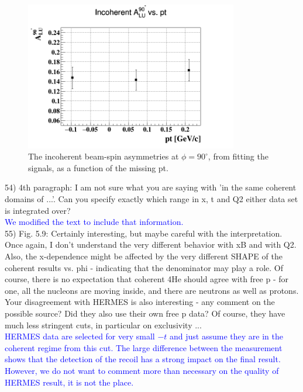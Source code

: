  \begin{figure}[h!]
  \centering
  \includegraphics[height=6.5cm]{fig/incoh_PT_alpha.png}
  \caption{The incoherent beam-spin asymmetries at $\phi = 90 ^{\circ}$, from 
  fitting the signals, as a function of the missing pt.}
  \label{fig:alu_alpha_bins_pt}
 \end{figure}




54) 4th paragraph: I am not sure what you are saying with 'in the same coherent 
domains of ...'. Can you specify exactly which range in x, t and Q2 either data 
set is integrated over?\\
\textcolor{blue}{We modified the text to include that information. }\\

55) Fig. 5.9: Certainly interesting, but maybe careful with the interpretation.  
Once again, I don't understand the very different behavior with xB and with Q2.  
Also, the x-dependence might be affected by the very different SHAPE of the 
coherent results vs. phi - indicating that the denominator may play a role. Of 
course, there is no expectation that coherent 4He should agree with free p - 
for one, all the nucleons are moving inside, and there are neutrons as well as 
protons.  Your disagreement with HERMES is also interesting - any comment on 
the possible source? Did they also use their own free p data? Of course, they 
have much less stringent cuts, in particular on exclusivity ... \\
\textcolor{blue}{HERMES data are selected for very small $-t$ and just assume 
they are in the coherent regime from this cut. The large difference between the 
measurement shows that the detection of the recoil has a strong impact on the 
final result. However, we do not want to comment more than necessary on the 
quality of HERMES result, it is not the place.}\\



